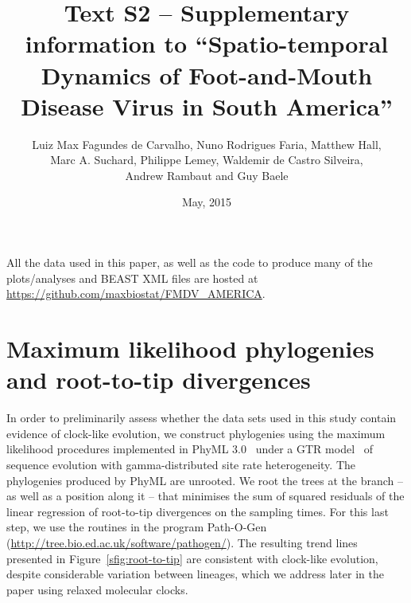 \documentclass[a4paper,10pt]{article}
\title{Text S2 -- Supplementary information to ``Spatio-temporal Dynamics of Foot-and-Mouth Disease Virus in South America''}
\author{
Luiz Max Fagundes de Carvalho, Nuno Rodrigues Faria, Matthew Hall,\\
Marc A. Suchard, Philippe Lemey, Waldemir de Castro Silveira,\\
Andrew Rambaut and Guy Baele
}
\date{May, 2015}
\begin{document}
\maketitle

All the data used in this paper, as well as the code to produce many of the plots/analyses and BEAST XML files are hosted at \url{https://github.com/maxbiostat/FMDV_AMERICA}.

\section*{Maximum likelihood phylogenies and root-to-tip divergences}

In order to preliminarily assess whether the data sets used in this study contain evidence of clock-like evolution, we construct phylogenies using the maximum likelihood procedures implemented in PhyML 3.0~\cite{M-phyml} under a GTR model~\cite{M-Tavare1986} of sequence evolution with gamma-distributed site rate heterogeneity.
The phylogenies produced by PhyML are unrooted.
We root the trees at the branch -- as well as a position along it -- that minimises the sum of squared residuals of the linear regression of root-to-tip divergences on the sampling times.
For this last step, we use the routines in the program Path-O-Gen (\url{http://tree.bio.ed.ac.uk/software/pathogen/}).
The resulting trend lines presented in Figure~\ref{sfig:root-to-tip} are consistent with clock-like evolution, despite considerable variation between lineages, which we address later in the paper using relaxed molecular clocks.
\end{document}
